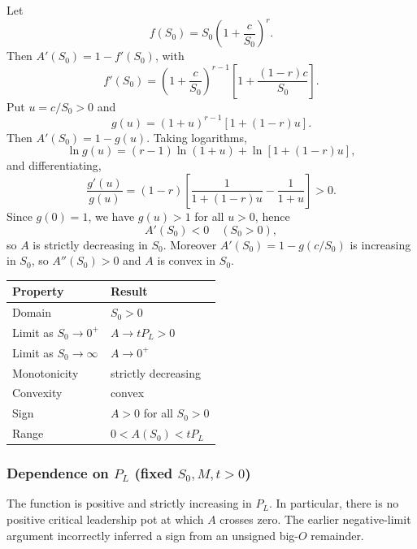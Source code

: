 \documentclass[11pt,a4paper]{article}
\begin{document}
Let
\begin{equation}
f(S_0)=S_0\left(1+\frac{c}{S_0}\right)^r.
\end{equation}
Then $A'(S_0)=1-f'(S_0)$, with
\begin{equation}
f'(S_0)=\left(1+\frac{c}{S_0}\right)^{r-1}
\left[1+\frac{(1-r)c}{S_0}\right].
\end{equation}
Put $u=c/S_0>0$ and
\begin{equation}
g(u)=(1+u)^{r-1}\left[1+(1-r)u\right].
\end{equation}
Then $A'(S_0)=1-g(u)$. Taking logarithms,
\begin{equation}
\ln g(u)=(r-1)\ln(1+u)+\ln\left[1+(1-r)u\right],
\end{equation}
and differentiating,
\begin{equation}
\frac{g'(u)}{g(u)}
=(1-r)\left[\frac{1}{1+(1-r)u}-\frac{1}{1+u}\right]>0.
\end{equation}
Since $g(0)=1$, we have $g(u)>1$ for all $u>0$, hence
\begin{equation}
A'(S_0)<0\quad(S_0>0),
\end{equation}
so $A$ is strictly decreasing in $S_0$. Moreover $A'(S_0)=1-g(c/S_0)$ is increasing in $S_0$, so $A''(S_0)>0$ and $A$ is convex in $S_0$.

\begin{center}
\small
\begin{tabularx}{\linewidth}{@{}YY@{}}
\toprule
Property & Result\\
\midrule
Domain & $S_0>0$\\
Limit as $S_0\to0^+$ & $A\to tP_L>0$\\
Limit as $S_0\to\infty$ & $A\to0^+$\\
Monotonicity & strictly decreasing\\
Convexity & convex\\
Sign & $A>0$ for all $S_0>0$\\
Range & $0<A(S_0)<tP_L$\\
\bottomrule
\end{tabularx}
\end{center}

\subsubsection{Dependence on $P_L$ (fixed $S_0,M,t>0$)}
The function is positive and strictly increasing in $P_L$. In particular, there is no positive critical leadership pot at which $A$ crosses zero. The earlier negative-limit argument incorrectly inferred a sign from an unsigned big-$O$ remainder.
\end{document}
